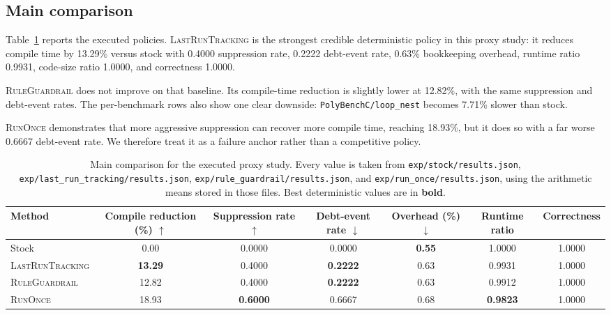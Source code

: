 \documentclass{article}
\begin{document}
\subsection{Main comparison}

Table~\ref{tab:main-results} reports the executed policies. \textsc{LastRunTracking} is the strongest credible deterministic policy in this proxy study: it reduces compile time by 13.29\% versus stock with 0.4000 suppression rate, 0.2222 debt-event rate, 0.63\% bookkeeping overhead, runtime ratio 0.9931, code-size ratio 1.0000, and correctness 1.0000.

\textsc{RuleGuardrail} does not improve on that baseline. Its compile-time reduction is slightly lower at 12.82\%, with the same suppression and debt-event rates. The per-benchmark rows also show one clear downside: \texttt{PolyBenchC/loop\_nest} becomes 7.71\% slower than stock.

\textsc{RunOnce} demonstrates that more aggressive suppression can recover more compile time, reaching 18.93\%, but it does so with a far worse 0.6667 debt-event rate. We therefore treat it as a failure anchor rather than a competitive policy.

\begin{table}[t]
\caption{Main comparison for the executed proxy study. Every value is taken from \texttt{exp/stock/results.json}, \texttt{exp/last\_run\_tracking/results.json}, \texttt{exp/rule\_guardrail/results.json}, and \texttt{exp/run\_once/results.json}, using the arithmetic means stored in those files. Best deterministic values are in \textbf{bold}.}
\label{tab:main-results}
\centering
\small
\begin{tabular}{lcccccc}
\toprule
Method & Compile reduction (\%) $\uparrow$ & Suppression rate $\uparrow$ & Debt-event rate $\downarrow$ & Overhead (\%) $\downarrow$ & Runtime ratio & Correctness \\
\midrule
Stock & 0.00 & 0.0000 & 0.0000 & \textbf{0.55} & 1.0000 & 1.0000 \\
\textsc{LastRunTracking} & \textbf{13.29} & 0.4000 & \textbf{0.2222} & 0.63 & 0.9931 & 1.0000 \\
\textsc{RuleGuardrail} & 12.82 & 0.4000 & \textbf{0.2222} & 0.63 & 0.9912 & 1.0000 \\
\textsc{RunOnce} & 18.93 & \textbf{0.6000} & 0.6667 & 0.68 & \textbf{0.9823} & 1.0000 \\
\bottomrule
\end{tabular}
\end{table}
\end{document}
